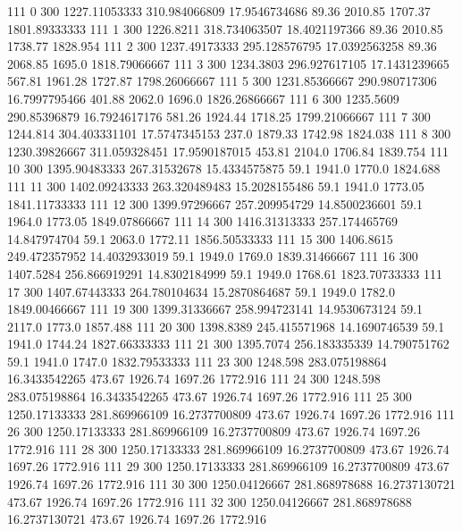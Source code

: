 111  0  300  1227.11053333  310.984066809  17.9546734686  89.36  2010.85  1707.37  1801.89333333 
111  1  300  1226.8211  318.734063507  18.4021197366  89.36  2010.85  1738.77  1828.954 
111  2  300  1237.49173333  295.128576795  17.0392563258  89.36  2068.85  1695.0  1818.79066667 
111  3  300  1234.3803  296.927617105  17.1431239665  567.81  1961.28  1727.87  1798.26066667 
111  5  300  1231.85366667  290.980717306  16.7997795466  401.88  2062.0  1696.0  1826.26866667 
111  6  300  1235.5609  290.85396879  16.7924617176  581.26  1924.44  1718.25  1799.21066667 
111  7  300  1244.814  304.403331101  17.5747345153  237.0  1879.33  1742.98  1824.038 
111  8  300  1230.39826667  311.059328451  17.9590187015  453.81  2104.0  1706.84  1839.754 
111  10  300  1395.90483333  267.31532678  15.4334575875  59.1  1941.0  1770.0  1824.688 
111  11  300  1402.09243333  263.320489483  15.2028155486  59.1  1941.0  1773.05  1841.11733333 
111  12  300  1399.97296667  257.209954729  14.8500236601  59.1  1964.0  1773.05  1849.07866667 
111  14  300  1416.31313333  257.174465769  14.847974704  59.1  2063.0  1772.11  1856.50533333 
111  15  300  1406.8615  249.472357952  14.4032933019  59.1  1949.0  1769.0  1839.31466667 
111  16  300  1407.5284  256.866919291  14.8302184999  59.1  1949.0  1768.61  1823.70733333 
111  17  300  1407.67443333  264.780104634  15.2870864687  59.1  1949.0  1782.0  1849.00466667 
111  19  300  1399.31336667  258.994723141  14.9530673124  59.1  2117.0  1773.0  1857.488 
111  20  300  1398.8389  245.415571968  14.1690746539  59.1  1941.0  1744.24  1827.66333333 
111  21  300  1395.7074  256.183335339  14.790751762  59.1  1941.0  1747.0  1832.79533333 
111  23  300  1248.598  283.075198864  16.3433542265  473.67  1926.74  1697.26  1772.916 
111  24  300  1248.598  283.075198864  16.3433542265  473.67  1926.74  1697.26  1772.916 
111  25  300  1250.17133333  281.869966109  16.2737700809  473.67  1926.74  1697.26  1772.916 
111  26  300  1250.17133333  281.869966109  16.2737700809  473.67  1926.74  1697.26  1772.916 
111  28  300  1250.17133333  281.869966109  16.2737700809  473.67  1926.74  1697.26  1772.916 
111  29  300  1250.17133333  281.869966109  16.2737700809  473.67  1926.74  1697.26  1772.916 
111  30  300  1250.04126667  281.868978688  16.2737130721  473.67  1926.74  1697.26  1772.916 
111  32  300  1250.04126667  281.868978688  16.2737130721  473.67  1926.74  1697.26  1772.916 


